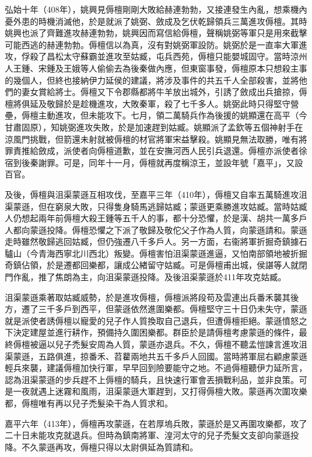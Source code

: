 弘始十年（408年），姚興見傉檀剛剛大敗給赫連勃勃，又接連發生內亂，想乘機內憂外患的時機消滅他，於是就派了姚弼、斂成及乞伏乾歸領兵三萬進攻傉檀。其時姚興也派了齊難進攻赫連勃勃，姚興因而寫信給傉檀，聲稱姚弼等軍只是用來截擊可能西逃的赫連勃勃。傉檀信以為真，沒有對姚弼軍設防。姚弼於是一直率大軍進攻，俘殺了昌松太守蘇霸並進攻至姑臧，屯兵西苑，傉檀只能嬰城固守。當時涼州人王鍾、宋鍾及王娥等人偷偷去為後秦做內應，但東窗事發，傉檀原本只想殺主事的幾個人，但終也接納伊力延侯的建議，將涉及事件的共五千人全部殺害，並將他們的妻女賞給將士。傉檀又下令郡縣都將牛羊放出城外，引誘了斂成出兵搶掠，傉檀將俱延及敬歸於是趁機進攻，大敗秦軍，殺了七千多人。姚弼此時只得堅守營壘，傉檀主動進攻，但未能攻下。七月，領二萬騎兵作為後援的姚顯還在高平（今甘肅固原），知姚弼進攻失敗，於是加速趕到姑臧。姚顯派了孟欽等五個神射手在涼風門挑戰，但箭還未射就被傉檀的材官將軍宋益擊殺。姚顯見無法取勝，唯有將罪責推給斂成，派使者向傉檀道歉，並在安撫河西人民引兵退還。傉檀亦派使者徐宿到後秦謝罪。可是，同年十一月，傉檀就再度稱涼王，並設年號「嘉平」，又設百官。

及後，傉檀與沮渠蒙遜互相攻伐，至嘉平三年（410年），傉檀又自率五萬騎進攻沮渠蒙遜，但在窮泉大敗，只得隻身騎馬逃歸姑臧；蒙遜更乘勝進攻姑臧。當時姑臧人仍想起兩年前傉檀大殺王鍾等五千人的事，都十分恐懼，於是漢、胡共一萬多戶人都向蒙遜投降。傉檀恐懼之下派了敬歸及敬佗父子作為人質，向蒙遜請和。蒙遜走時雖然敬歸逃回姑臧，但仍強遷八千多戶人。另一方面，右衞將軍折掘奇鎮據石驢山（今青海西寧北川西北）叛變。傉檀害怕沮渠蒙遜進逼，又怕南部領地被折掘奇鎮佔領，於是遷都回樂都，讓成公緖留守姑臧。可是傉檀甫出城，侯諶等人就閉門作亂，推了焦朗為主，向沮渠蒙遜投降。及後沮渠蒙遜於411年攻克姑臧。

沮渠蒙遜乘著取姑臧威勢，於是進攻傉檀，傉檀派將段苟及雲連出兵番禾襲其後方，遷了三千多戶到西平，但蒙遜依然進圍樂都。傉檀堅守三十日仍未失守，蒙遜就是派使者誘傉檀以寵愛的兒子作人質換取自己退兵，但遭傉檀拒絕。蒙遜憤怒之下決定建屋並進行耕作，預備持久圍困樂都。群臣於是請傉檀考慮蒙遜的條件，最終傉檀被逼以兒子禿髮安周為人質，蒙遜亦退兵。不久，傉檀不聽孟愷諫言進攻沮渠蒙遜，五路俱進，掠番禾、苕藋兩地共五千多戶人回國。當時將軍屈右顧慮蒙遜輕兵來襲，建議傉檀加快行軍，早早回到險要能守之地。不過傉檀聽伊力延所言，認為沮渠蒙遜的步兵趕不上傉檀的騎兵，且快速行軍會丟損戰利品，並非良策。可是一夜就遇上迷霧和風雨，沮渠蒙遜大軍趕到，又打得傉檀大敗。蒙遜再次圍攻樂都，傉檀唯有再以兒子禿髮染干為人質求和。

嘉平六年（413年），傉檀再攻蒙遜，在若厚塢兵敗，蒙遜於是又再圍攻樂都，攻了二十日未能攻克就退兵。但時為鎮南將軍、湟河太守的兒子禿髮文支卻向蒙遜投降。不久蒙遜再攻，傉檀只得以太尉俱延為質請和。


